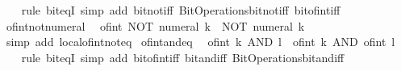 \begin{isabellebody}
%
\isadelimproof
\ \ %
\endisadelimproof
%
\isatagproof
{}\isamarkupfalse%
\ {\isacharparenleft}{\kern0pt}rule\ bit{\isacharunderscore}{\kern0pt}eqI{\isacharparenright}{\kern0pt}\ {\isacharparenleft}{\kern0pt}simp\ add{\isacharcolon}{\kern0pt}\ bit{\isacharunderscore}{\kern0pt}not{\isacharunderscore}{\kern0pt}iff\ Bit{\isacharunderscore}{\kern0pt}Operations{\isachardot}{\kern0pt}bit{\isacharunderscore}{\kern0pt}not{\isacharunderscore}{\kern0pt}iff\ bit{\isacharunderscore}{\kern0pt}of{\isacharunderscore}{\kern0pt}int{\isacharunderscore}{\kern0pt}iff{\isacharparenright}{\kern0pt}%
\endisatagproof
{\isafoldproof}%
%
\isadelimproof
\isanewline
%
\endisadelimproof
\isanewline
{}\isamarkupfalse%
\ of{\isacharunderscore}{\kern0pt}int{\isacharunderscore}{\kern0pt}not{\isacharunderscore}{\kern0pt}numeral{\isacharcolon}{\kern0pt}\isanewline
\ \ {\isacartoucheopen}of{\isacharunderscore}{\kern0pt}int\ {\isacharparenleft}{\kern0pt}NOT\ {\isacharparenleft}{\kern0pt}numeral\ k{\isacharparenright}{\kern0pt}{\isacharparenright}{\kern0pt}\ {\isacharequal}{\kern0pt}\ NOT\ {\isacharparenleft}{\kern0pt}numeral\ k{\isacharparenright}{\kern0pt}{\isacartoucheclose}\isanewline
%
\isadelimproof
\ \ %
\endisadelimproof
%
\isatagproof
{}\isamarkupfalse%
\ {\isacharparenleft}{\kern0pt}simp\ add{\isacharcolon}{\kern0pt}\ local{\isachardot}{\kern0pt}of{\isacharunderscore}{\kern0pt}int{\isacharunderscore}{\kern0pt}not{\isacharunderscore}{\kern0pt}eq{\isacharparenright}{\kern0pt}%
\endisatagproof
{\isafoldproof}%
%
\isadelimproof
\isanewline
%
\endisadelimproof
\isanewline
{}\isamarkupfalse%
\ of{\isacharunderscore}{\kern0pt}int{\isacharunderscore}{\kern0pt}and{\isacharunderscore}{\kern0pt}eq{\isacharcolon}{\kern0pt}\isanewline
\ \ {\isacartoucheopen}of{\isacharunderscore}{\kern0pt}int\ {\isacharparenleft}{\kern0pt}k\ AND\ l{\isacharparenright}{\kern0pt}\ {\isacharequal}{\kern0pt}\ of{\isacharunderscore}{\kern0pt}int\ k\ AND\ of{\isacharunderscore}{\kern0pt}int\ l{\isacartoucheclose}\isanewline
%
\isadelimproof
\ \ %
\endisadelimproof
%
\isatagproof
{}\isamarkupfalse%
\ {\isacharparenleft}{\kern0pt}rule\ bit{\isacharunderscore}{\kern0pt}eqI{\isacharparenright}{\kern0pt}\ {\isacharparenleft}{\kern0pt}simp\ add{\isacharcolon}{\kern0pt}\ bit{\isacharunderscore}{\kern0pt}of{\isacharunderscore}{\kern0pt}int{\isacharunderscore}{\kern0pt}iff\ bit{\isacharunderscore}{\kern0pt}and{\isacharunderscore}{\kern0pt}iff\ Bit{\isacharunderscore}{\kern0pt}Operations{\isachardot}{\kern0pt}bit{\isacharunderscore}{\kern0pt}and{\isacharunderscore}{\kern0pt}iff{\isacharparenright}{\kern0pt}%

\end{isabellebody}
